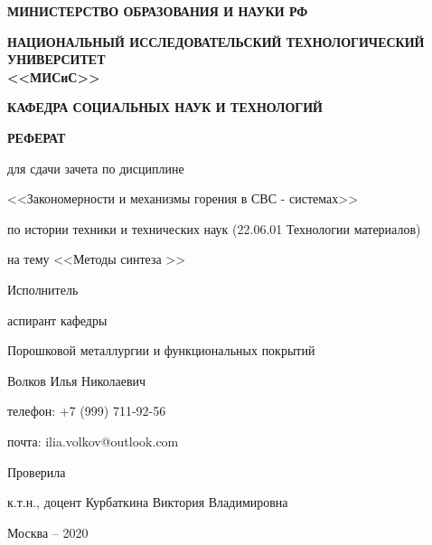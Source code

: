 \thispagestyle{empty}	

	\begin{center}
		\textbf{МИНИСТЕРСТВО ОБРАЗОВАНИЯ И НАУКИ РФ}
		\vspace{1ex}
		
		\textbf{НАЦИОНАЛЬНЫЙ ИССЛЕДОВАТЕЛЬСКИЙ ТЕХНОЛОГИЧЕСКИЙ УНИВЕРСИТЕТ \\ <<МИСиС>>}
		
		\vspace{1ex}
		
		\textbf{КАФЕДРА СОЦИАЛЬНЫХ НАУК И ТЕХНОЛОГИЙ}
	\end{center}
	
	\begin{center}
		\vspace{8ex}
		\textbf{РЕФЕРАТ}
		\vspace{1ex}
		
		для сдачи зачета по дисциплине
		
		<<Закономерности и механизмы горения в СВС - системах>>
		
	
		по истории техники и технических наук (22.06.01 Технологии материалов)
		
        на тему <<Методы синтеза >>
		
		\vspace{2ex}
		
		\begin{flushright}
	
			Исполнитель
			
			аспирант кафедры 
			
			Порошковой металлургии и функциональных покрытий
						
			Волков Илья Николаевич
			
			телефон: +7 (999) 711-92-56
			
			почта: ilia.volkov@outlook.com
			
			\vspace{2ex}
			Проверила
			
			\underline{\hspace{9cm}}
			
			к.т.н., доцент Курбаткина Виктория Владимировна
			 
		\end{flushright}
		
		\vfill
		Москва -- 2020
	\end{center}


